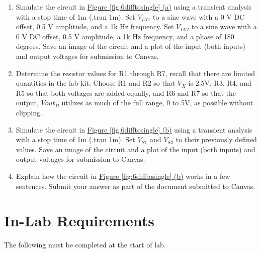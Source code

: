 \begin{enumerate}
	\item Simulate the circuit in \hyperref[fig:6difftosingle]{Figure \ref*{fig:6difftosingle} (a)} using a transient analysis with a stop time of 1m (.tran 1m). Set $V_{IN1}$ to a sine wave with a 0 V DC offset, 0.5 V amplitude, and a 1k Hz frequency. Set $V_{IN2}$ to a sine wave with a 0 V DC offset, 0.5 V amplitude, a 1k Hz frequency, and a phase of 180 degrees. Save an image of the circuit and a plot of the input (both inputs) and output voltages for submission to Canvas. \label{itm:6ssec3itm1}
	\item Determine the resistor values for R1 through R7, recall that there are limited quantities in the lab kit. Choose R1 and R2 so that $V_X$ is 2.5V, R3, R4, and R5 so that both voltages are added equally, and R6 and R7 so that the output, $Vout_B$ utilizes as much of the full range, 0 to 5V, as possible without clipping. \label{itm:6ssec3itm2}
	\item Simulate the circuit in \hyperref[fig:6difftosingle]{Figure \ref*{fig:6difftosingle} (b)} using a transient analysis with a stop time of 1m (.tran 1m). Set $V_{S1}$ and $V_{S2}$ to their previously defined values. Save an image of the circuit and a plot of the input (both inputs) and output voltages for submission to Canvas. \label{itm:6ssec3itm3}
	\item Explain how the circuit in \hyperref[fig:6difftosingle]{Figure \ref*{fig:6difftosingle} (b)} works  in a few sentences. Submit your answer as part of the document submitted to Canvas. \label{itm:6ssec3itm4}
\end{enumerate}

\newpage

\section{In-Lab Requirements}

The following must be completed at the start of lab. 

